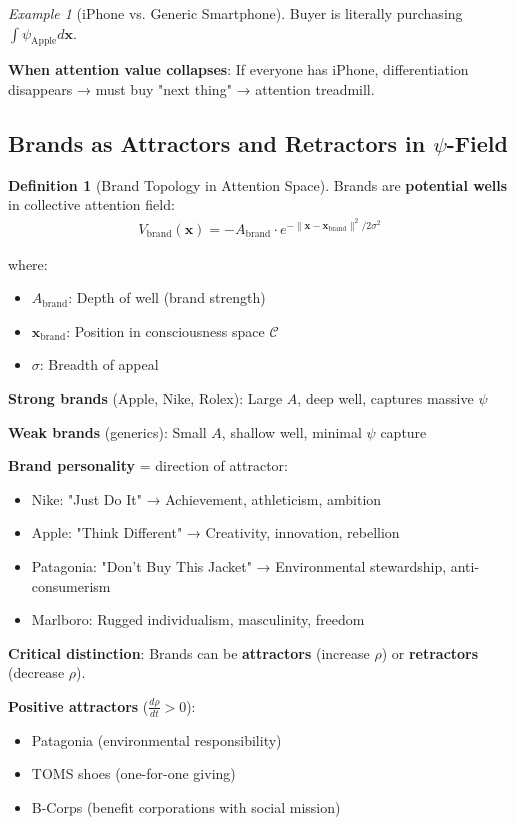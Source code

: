 \documentclass[11pt,a4paper]{article}
\theoremstyle{definition}
\newtheorem{definition}{Definition}[section]
\theoremstyle{remark}
\newtheorem{example}{Example}[section]
\newcommand{\CC}{\mathcal{C}}
\begin{document}
\begin{small}
\begin{enumerate}
\begin{example}[iPhone vs. Generic Smartphone]
Buyer is literally purchasing \(\int \psi_{\text{Apple}} d\mathbf{x}\).

\textbf{When attention value collapses}: If everyone has iPhone, differentiation disappears → must buy "next thing" → attention treadmill.
\end{example}

\subsection{Brands as Attractors and Retractors in \(\psi\)-Field}

\begin{definition}[Brand Topology in Attention Space]
Brands are \textbf{potential wells} in collective attention field:
\begin{align}
V_{\text{brand}}(\mathbf{x}) = -A_{\text{brand}} \cdot e^{-\|\mathbf{x} - \mathbf{x}_{\text{brand}}\|^2 / 2\sigma^2}
\end{align}

where:
\begin{itemize}
    \item \(A_{\text{brand}}\): Depth of well (brand strength)
    \item \(\mathbf{x}_{\text{brand}}\): Position in consciousness space \(\CC\)
    \item \(\sigma\): Breadth of appeal
\end{itemize}

\textbf{Strong brands} (Apple, Nike, Rolex): Large \(A\), deep well, captures massive \(\psi\)

\textbf{Weak brands} (generics): Small \(A\), shallow well, minimal \(\psi\) capture

\textbf{Brand personality} = direction of attractor:
\begin{itemize}
    \item Nike: "Just Do It" → Achievement, athleticism, ambition
    \item Apple: "Think Different" → Creativity, innovation, rebellion
    \item Patagonia: "Don't Buy This Jacket" → Environmental stewardship, anti-consumerism
    \item Marlboro: Rugged individualism, masculinity, freedom
\end{itemize}

\textbf{Critical distinction}: Brands can be \textbf{attractors} (increase \(\rho\)) or \textbf{retractors} (decrease \(\rho\)).

\textbf{Positive attractors} (\(\frac{d\rho}{dt} > 0\)):
\begin{itemize}
    \item Patagonia (environmental responsibility)
    \item TOMS shoes (one-for-one giving)
    \item B-Corps (benefit corporations with social mission)
\end{itemize}


\end{definition}
\end{enumerate}
\end{small}
\end{document}

